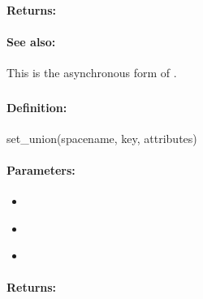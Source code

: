 \paragraph{Returns:}


\paragraph{See also:}  This is the asynchronous form of .

\pagebreak
\subsubsection{}
\label{api:ruby:set_union}


\paragraph{Definition:}
\begin{rubycode}
set_union(spacename, key, attributes)
\end{rubycode}

\paragraph{Parameters:}
\begin{itemize}[noitemsep]
\item {}\\

\item {}\\

\item {}\\

\end{itemize}

\paragraph{Returns:}


\pagebreak
\subsubsection{}
\label{api:ruby:async_set_union}


